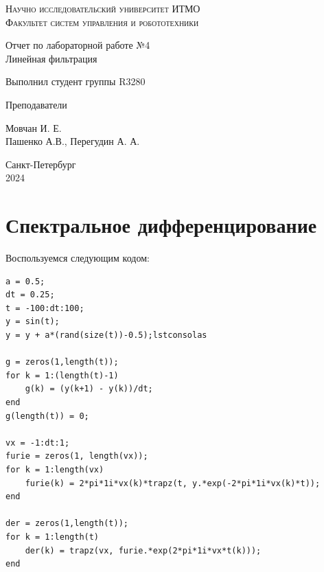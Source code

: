 \documentclass[a4paper,hidelinks,14pt]{extarticle}
\begin{document}
	\begin{titlepage}
		\setlength{\parindent}{0ex}
		
		\begin{center}
			\textsc{
				\vspace{1ex}
				Научно исследовательский университет ИТМО \\
				\vspace{0.5ex}
				Факультет систем управления и робототехники \\
				\vspace{0.5ex}
			}
		\end{center}
		
		\vspace{50mm}
		
		\begin{center}
			Отчет по лабораторной работе №4 \\
			Линейная фильтрация
		\end{center}
		
		\vspace{50mm}
		
		\begin{minipage}{.55\linewidth}
			Выполнил студент группы R3280
			
			Преподаватели
		\end{minipage}
		\hfill
		\begin{minipage}{.5\linewidth}
			\begin{flushright}
				Мовчан И. Е.
				\\
				Пашенко А.В., Перегудин А. А.
			\end{flushright}
		\end{minipage}
		
		\vfill
		\begin{center}
			Санкт-Петербург
			\\
			2024
		\end{center}
		
	\end{titlepage}
	
	\section{Спектральное дифференцирование}
	
	Воспользуемся следующим кодом:

	\begin{lstlisting}[style=Matlab-editor, basicstyle=\footnotesize, caption={Базовый код}]
a = 0.5;
dt = 0.25;
t = -100:dt:100;
y = sin(t);
y = y + a*(rand(size(t))-0.5);lstconsolas

g = zeros(1,length(t));
for k = 1:(length(t)-1)
	g(k) = (y(k+1) - y(k))/dt;
end
g(length(t)) = 0;

vx = -1:dt:1;
furie = zeros(1, length(vx));
for k = 1:length(vx)
	furie(k) = 2*pi*1i*vx(k)*trapz(t, y.*exp(-2*pi*1i*vx(k)*t));
end

der = zeros(1,length(t));
for k = 1:length(t)
	der(k) = trapz(vx, furie.*exp(2*pi*1i*vx*t(k)));
end		
	\end{lstlisting}
	
\end{document}
